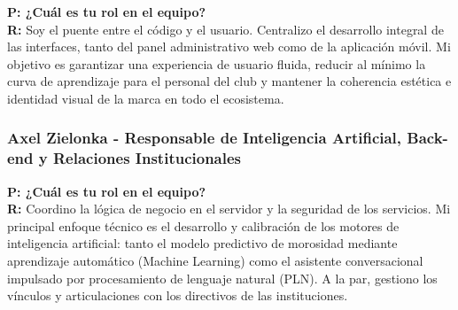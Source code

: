 \textbf{P: ¿Cuál es tu rol en el equipo?} \\
\textbf{R:} Soy el puente entre el código y el usuario. Centralizo el desarrollo integral de las interfaces, tanto del panel administrativo web como de la aplicación móvil. Mi objetivo es garantizar una experiencia de usuario fluida, reducir al mínimo la curva de aprendizaje para el personal del club y mantener la coherencia estética e identidad visual de la marca en todo el ecosistema.

\subsubsection{Axel Zielonka - Responsable de Inteligencia Artificial, Back-end y Relaciones Institucionales}

\textbf{P: ¿Cuál es tu rol en el equipo?} \\
\textbf{R:} Coordino la lógica de negocio en el servidor y la seguridad de los servicios. Mi principal enfoque técnico es el desarrollo y calibración de los motores de inteligencia artificial: tanto el modelo predictivo de morosidad mediante aprendizaje automático (Machine Learning) como el asistente conversacional impulsado por procesamiento de lenguaje natural (PLN). A la par, gestiono los vínculos y articulaciones con los directivos de las instituciones.
